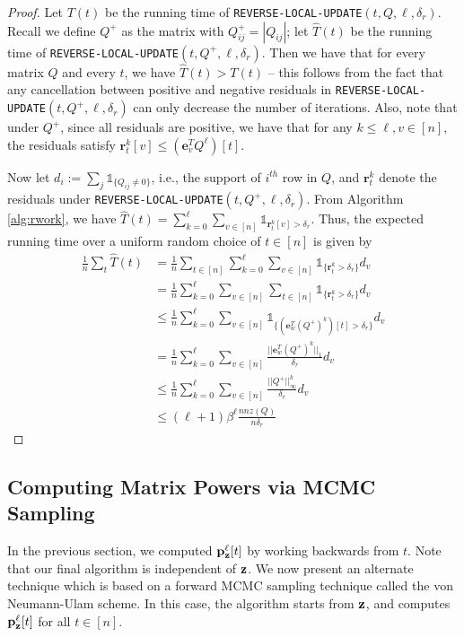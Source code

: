 \begin{proof}
Let $T(t)$ be the running time of \texttt{REVERSE-LOCAL-UPDATE}$(t,Q,\ell,\delta_r)$.
Recall we define $Q^+$ as the matrix with $Q^+_{ij} = |Q_{ij}|$; let $\hat{T}(t)$ be the running time of \texttt{REVERSE-LOCAL-UPDATE}$(t,Q^+,\ell,\delta_r)$. 
Then we have that for every matrix $Q$ and every $t$, we have $\hat{T}(t)>T(t)$ -- this follows from the fact that any cancellation between positive and negative residuals in \texttt{REVERSE-LOCAL-UPDATE}$(t,Q^+,\ell,\delta_r)$ can only decrease the number of iterations. 
Also, note that under $Q^+$, since all residuals are positive, we have that for any $k\leq\ell,v\in[n]$, the residuals satisfy $\mathbf{r}_t^{k}[v]\leq \left(\mathbf{e}_v^TQ^\ell\right)[t]$.

Now let $d_i := \sum_j\mathds{1}_{\{Q_{ij}\neq 0\}}$, i.e., the support of $i^{th}$ row in $Q$, and $\mathbf{r}_t^{k}$ denote the residuals under \texttt{REVERSE-LOCAL-UPDATE}$(t,Q^+,\ell,\delta_r)$. 
From Algorithm \ref{alg:rwork}, we have $\hat{T}(t) = \sum_{k=0}^{\ell}\sum_{v\in[n]}\mathds{1}_{\mathbf{r}_t^{k}[v]>\delta_r}$.
Thus, the expected running time over a uniform random choice of $t\in[n]$ is given by
\begin{align*}
\frac{1}{n}\sum_t\hat{T}(t) &= \frac{1}{n}\sum_{t\in[n]}\sum_{k=0}^{\ell}\sum_{v\in[n]}\mathds{1}_{\{\mathbf{r}_t^{k}>\delta_r\}}d_v\\
&=\frac{1}{n}\sum_{k=0}^{\ell}\sum_{v\in[n]}\sum_{t\in[n]}\mathds{1}_{\{\mathbf{r}_t^{k}>\delta_r\}}d_v\\
&\leq\frac{1}{n}\sum_{k=0}^{\ell}\sum_{v\in[n]} \mathds{1}_{\{\left(\mathbf{e}_w^T(Q^+)^k\right)[t]>\delta_r\}}d_v\\
&=\frac{1}{n}\sum_{k=0}^{\ell}\sum_{v\in[n]} \frac{||\mathbf{e}_w^T(Q^+)^k||_1}{\delta_r}d_v\\
&\leq\frac{1}{n}\sum_{k=0}^{\ell}\sum_{v\in[n]} \frac{||Q^+||_{\infty}^k}{\delta_r}d_v\\
&\leq\left(\ell+1\right)\beta^{\ell} \frac{nnz(Q)}{n\delta_r}
\end{align*}
\end{proof}


\subsection{Computing Matrix Powers via MCMC Sampling}
\label{ssec:forwardwork}


In the previous section, we computed ${\mathbf{p}}_\mathbf{z}^{\ell}[t]$ by working backwards from $t$. 
Note that our final algorithm is independent of $\mathbf{z}$.
We now present an alternate technique which is based on a forward MCMC sampling technique called the von Neumann-Ulam scheme. 
In this case, the algorithm starts from $\mathbf{z}$, and computes ${\mathbf{p}}_\mathbf{z}^{\ell}[t]$ for all $t\in[n]$.

